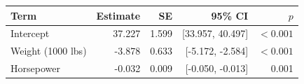 \begin{tabular}{lrrrr}
\hline
Term & Estimate & SE & 95\% CI & $p$ \\
\hline
Intercept & 37.227 & 1.599 & [33.957, 40.497] & $<0.001$ \\
Weight (1000 lbs) & -3.878 & 0.633 & [-5.172, -2.584] & $<0.001$ \\
Horsepower & -0.032 & 0.009 & [-0.050, -0.013] & 0.001 \\
\hline
\end{tabular}
